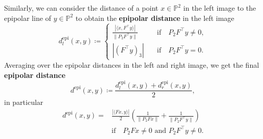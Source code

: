 \documentclass[10pt, twocolumn]{article}
\theoremstyle{definition}
\begin{document}
Similarly, we can consider the distance
of a point $x\in\mathbb P^2$ in the left image to the epipolar line  of $y\in\mathbb P^2$ to obtain the \textbf{epipolar distance} in the left image
\begin{equation} \label{eq:dj}
   d^\mathrm{epi}_l(x, y) 
   \coloneqq
   \begin{cases}\displaystyle
      \frac{|\langle x, F^\top y\rangle|}{\|P_2{F^\top y}\|}
   &\quad \text{if} \quad 
   P_2{F^\top y}\neq 0,
   \\ 
   |(F^\top y)_3| &\quad \text{if} \quad
   P_2{F^\top y}= 0.
   \end{cases}
\end{equation}
Averaging over the epipolar distances in the left and right image, we get
the final \textbf{epipolar distance}
\begin{equation} \label{eq:epipolar_distance}
d^{\mathrm{epi}}(x,y) 
\coloneqq \frac{
d^{\mathrm{epi}}_l(x,y) +
d^{\mathrm{epi}}_r(x,y) }{2},
\end{equation}
in particular
\begin{align} 
d^{\mathrm{epi}}(x,y) 
=& 
\frac{|\langle Fx,y \rangle |}2
\left( \frac{1}{\|P_2{Fx}\|} + \frac{1}{\|P_2{F^\top y}\|}\right)\\
&\text{if}\quad P_2{F x}\neq0\text{ and }P_2{F^\top y}\neq0.
\end{align}
\end{document}
